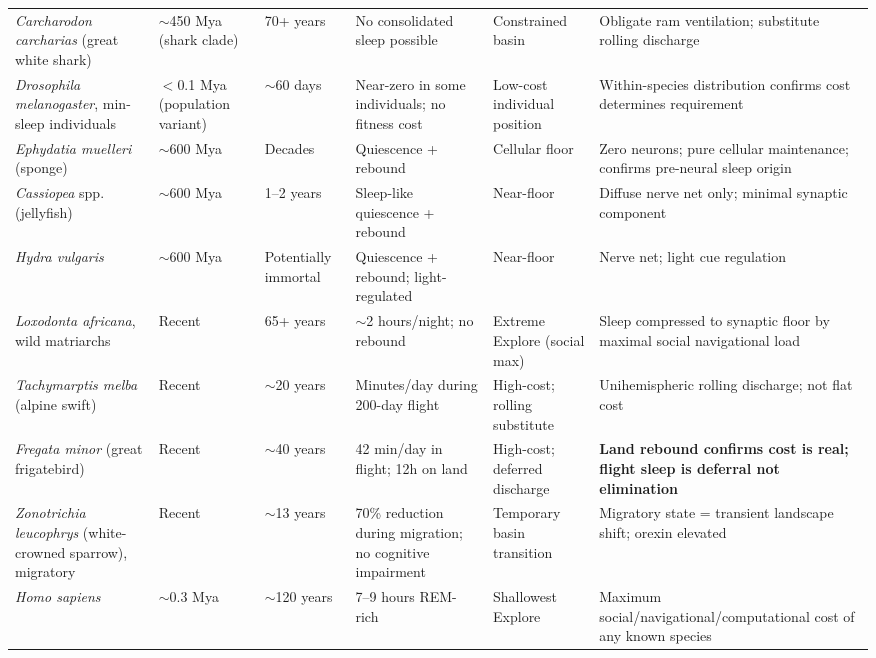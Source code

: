 \documentclass[12pt, a4paper]{article}
\begin{document}
\begin{longtable}{p{3.2cm} p{1.8cm} p{2.0cm} p{1.6cm} p{2.8cm} p{2.6cm}}
\textit{Carcharodon carcharias} (great white shark) &
$\sim$450 Mya (shark clade) &
70+ years &
No consolidated sleep possible &
Constrained basin &
Obligate ram ventilation; substitute rolling discharge \\[4pt]

\textit{Drosophila melanogaster}, min-sleep individuals &
$<$0.1 Mya (population variant) &
$\sim$60 days &
Near-zero in some individuals; no fitness cost &
Low-cost individual position &
Within-species distribution confirms cost determines requirement \\[4pt]

\textit{Ephydatia muelleri} (sponge) &
$\sim$600 Mya &
Decades &
Quiescence + rebound &
Cellular floor &
Zero neurons; pure cellular maintenance; confirms pre-neural sleep origin \\[4pt]

\textit{Cassiopea} spp. (jellyfish) &
$\sim$600 Mya &
1--2 years &
Sleep-like quiescence + rebound &
Near-floor &
Diffuse nerve net only; minimal synaptic component \\[4pt]

\textit{Hydra vulgaris} &
$\sim$600 Mya &
Potentially immortal &
Quiescence + rebound; light-regulated &
Near-floor &
Nerve net; light cue regulation \\[4pt]

\textit{Loxodonta africana}, wild matriarchs &
Recent &
65+ years &
$\sim$2 hours/night; no rebound &
Extreme Explore (social max) &
Sleep compressed to synaptic floor by maximal social navigational load \\[4pt]

\textit{Tachymarptis melba} (alpine swift) &
Recent &
$\sim$20 years &
Minutes/day during 200-day flight &
High-cost; rolling substitute &
Unihemispheric rolling discharge; not flat cost \\[4pt]

\textit{Fregata minor} (great frigatebird) &
Recent &
$\sim$40 years &
42 min/day in flight; 12h on land &
High-cost; deferred discharge &
\textbf{Land rebound confirms cost is real; flight sleep is deferral not elimination} \\[4pt]

\textit{Zonotrichia leucophrys} (white-crowned sparrow), migratory &
Recent &
$\sim$13 years &
70\% reduction during migration; no cognitive impairment &
Temporary basin transition &
Migratory state = transient landscape shift; orexin elevated \\[4pt]

\textit{Homo sapiens} &
$\sim$0.3 Mya &
$\sim$120 years &
7--9 hours REM-rich &
Shallowest Explore &
Maximum social/navigational/computational cost of any known species \\

\end{longtable}
\end{document}
